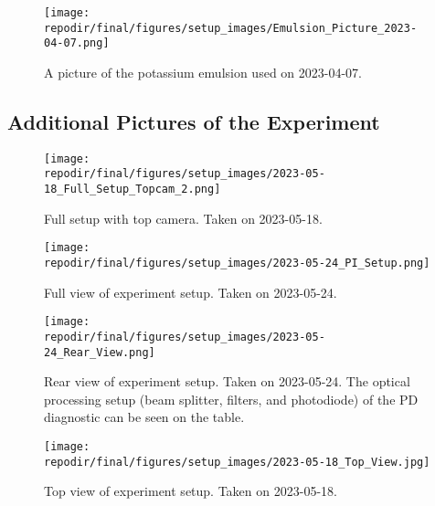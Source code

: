 \begin{figure}[]
\centering
\texttt{[image: \\repodir/final/figures/setup\_images/Emulsion\_Picture\_2023-04-07.png]}
\caption{A picture of the potassium emulsion used on 2023-04-07. }
\label{fig:SI_Emulsion_Picture}
\end{figure}

\clearpage
\subsection{Additional Pictures of the Experiment}

\begin{figure}[]
\centering
\texttt{[image: \\repodir/final/figures/setup\_images/2023-05-18\_Full\_Setup\_Topcam\_2.png]}
\caption{Full setup with top camera. Taken on 2023-05-18.}
\label{fig:SI_Full_Setup_Topcam}
\end{figure}

\begin{figure}[]
\centering
\texttt{[image: \\repodir/final/figures/setup\_images/2023-05-24\_PI\_Setup.png]}
\caption{Full view of experiment setup. Taken on 2023-05-24.}
\label{fig:SI_Full_Setup_PI}
\end{figure}


\begin{figure}[]
\centering
\texttt{[image: \\repodir/final/figures/setup\_images/2023-05-24\_Rear\_View.png]}
\caption{Rear view of experiment setup. Taken on 2023-05-24. The optical processing setup (beam splitter, filters, and photodiode) of the PD diagnostic can be seen on the table. }
\label{fig:SI_Rear_View}
\end{figure}

\begin{figure}[]
\centering
\texttt{[image: \\repodir/final/figures/setup\_images/2023-05-18\_Top\_View.jpg]}
\caption{Top view of experiment setup. Taken on 2023-05-18.}
\label{fig:SI_Top_View}
\end{figure}


